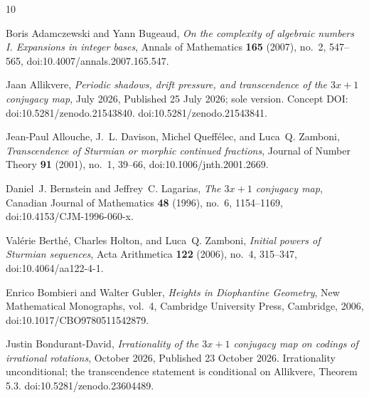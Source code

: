\documentclass[11pt,reqno]{amsart}
\theoremstyle{plain}
\theoremstyle{definition}
\begin{document}

\providecommand{\bysame}{\leavevmode\hbox to3em{\hrulefill}\thinspace}
\providecommand{\MR}{\relax\ifhmode\unskip\space\fi MR }
\providecommand{\MRhref}[2]{%
  \href{http://www.ams.org/mathscinet-getitem?mr=#1}{#2}
}
\providecommand{\href}[2]{#2}
\begin{thebibliography}{10}

Boris Adamczewski and Yann Bugeaud, \emph{On the complexity of algebraic
  numbers {I}. {E}xpansions in integer bases}, Annals of Mathematics
  \textbf{165} (2007), no.~2, 547--565, doi:10.4007/annals.2007.165.547.

Jaan Allikvere, \emph{Periodic shadows, drift pressure, and transcendence of
  the $3x+1$ conjugacy map}, July 2026, Published 25 July 2026; sole version.
  Concept DOI: doi:10.5281/zenodo.21543840. doi:10.5281/zenodo.21543841.

Jean-Paul Allouche, J.~L. Davison, Michel Queff\'elec, and Luca~Q. Zamboni,
  \emph{Transcendence of {S}turmian or morphic continued fractions}, Journal of
  Number Theory \textbf{91} (2001), no.~1, 39--66, doi:10.1006/jnth.2001.2669.

Daniel~J. Bernstein and Jeffrey~C. Lagarias, \emph{The $3x+1$ conjugacy map},
  Canadian Journal of Mathematics \textbf{48} (1996), no.~6, 1154--1169,
  doi:10.4153/CJM-1996-060-x.

Val\'erie Berth\'e, Charles Holton, and Luca~Q. Zamboni, \emph{Initial powers
  of {S}turmian sequences}, Acta Arithmetica \textbf{122} (2006), no.~4,
  315--347, doi:10.4064/aa122-4-1.

Enrico Bombieri and Walter Gubler, \emph{Heights in {D}iophantine {G}eometry},
  New Mathematical Monographs, vol.~4, Cambridge University Press, Cambridge,
  2006, doi:10.1017/CBO9780511542879.

Justin Bondurant-David, \emph{Irrationality of the $3x+1$ conjugacy map on
  codings of irrational rotations}, October 2026, Published 23 October 2026.
  Irrationality unconditional; the transcendence statement is conditional on
  Allikvere, Theorem 5.3. doi:10.5281/zenodo.23604489.


\end{thebibliography}
\end{document}

